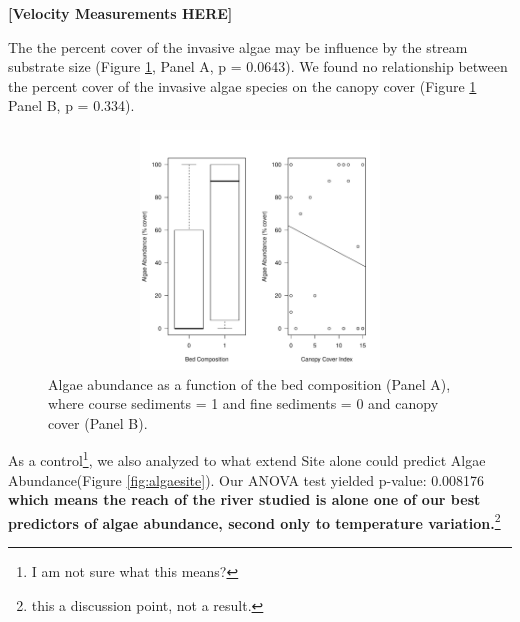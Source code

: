 \documentclass{article}\usepackage[]{graphicx}\usepackage[]{color}
\newenvironment{knitrout}{}{} %
\begin{document}
\textbf{[Velocity Measurements HERE]}

The the percent cover of the invasive algae may be influence by the stream substrate size (Figure \ref{fig:algae}, Panel A, p = 0.0643). We found no relationship between the percent cover of the invasive algae species on the canopy cover (Figure \ref{fig:algae} Panel B, p = 0.334).

\begin{figure}[!ht]
\begin{knitrout}
\color{fgcolor}
\includegraphics[width=5in,height=2.5in]{figure/unnamed-chunk-2-1} 

\end{knitrout}
\caption{Algae abundance as a function of the bed composition (Panel A), where course sediments = 1 and fine sediments = 0 and canopy cover (Panel B).}
\label{fig:algae}
\end{figure}

As a control\footnote{I am not sure what this means?}, we also analyzed to what extend Site alone could predict Algae Abundance(Figure \ref{fig:algaesite}). Our ANOVA test yielded p-value: 0.008176 \textbf{which means the reach of the river studied is alone one of our best predictors of algae abundance, second only to temperature variation.}\footnote{this a discussion point, not a result.} 
\end{document}
